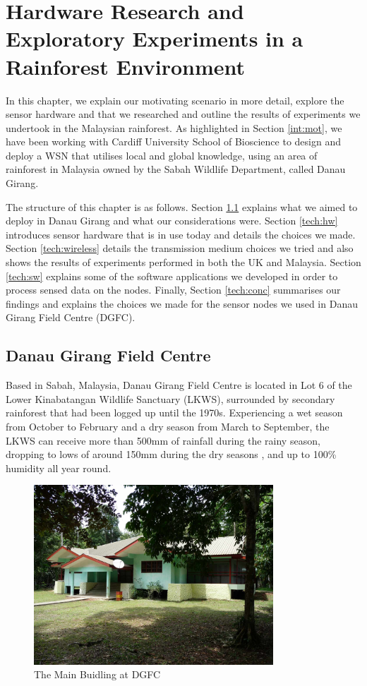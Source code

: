 \chapter{Hardware Research and Exploratory Experiments in a Rainforest Environment}\label{chap:technical}
	In this chapter, we explain our motivating scenario in more detail, explore the sensor hardware and that we researched and outline the results of experiments we undertook in the Malaysian rainforest. As highlighted in Section \ref{int:mot}, we have been working with Cardiff University School of Bioscience to design and deploy a WSN that utilises local and global knowledge, using an area of rainforest in Malaysia owned by the Sabah Wildlife Department, called Danau Girang.

The structure of this chapter is as follows. Section \ref{tech:motiv} explains what we aimed to deploy in Danau Girang and what our considerations were. Section \ref{tech:hw} introduces sensor hardware that is in use today and details the choices we made. Section \ref{tech:wireless} details the transmission medium choices we tried and also shows the results of experiments performed in both the UK and Malaysia. Section \ref{tech:sw} explains some of the software applications we developed in order to process sensed data on the nodes. Finally, Section \ref{tech:conc} summarises our findings and explains the choices we made for the sensor nodes we used in Danau Girang Field Centre (DGFC). 

\section{Danau Girang Field Centre}\label{tech:motiv}
Based in Sabah, Malaysia, Danau Girang Field Centre is located in Lot 6 of the Lower Kinabatangan Wildlife Sanctuary (LKWS), surrounded by secondary rainforest that had been logged up until the 1970s. Experiencing a wet season from October to February and a dry season from March to September, the LKWS can receive more than 500mm of rainfall during the rainy season, dropping to lows of around 150mm during the dry seasons \cite{Walsh2009}, and up to 100\% humidity all year round. 

		\begin{figure}[h]
		\centering
		\includegraphics[width=0.8\textwidth]{Chap3/figures/field_centre}
		\caption{The Main Buidling at DGFC}
		\label{tech:fig:map}
		\end{figure}

